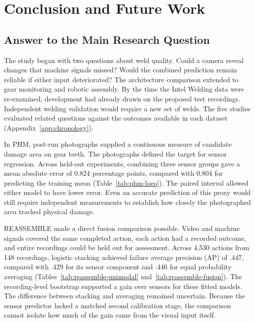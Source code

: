 \chapter{Conclusion and Future Work}
\label{ch:conclusion}

\section{Answer to the Main Research Question}
The study began with two questions about weld quality. Could a camera reveal changes that machine signals missed? Would the combined prediction remain reliable if either input deteriorated? The architecture comparison extended to gear monitoring and robotic assembly. By the time the Intel Welding data were re-examined, development had already drawn on the proposed test recordings. Independent welding validation would require a new set of welds. The five studies evaluated related questions against the outcomes available in each dataset (Appendix~\ref{app:chronology}).

In PHM, post-run photographs supplied a continuous measure of candidate damage area on gear teeth. The photographs defined the target for sensor regression. Across held-out experiments, combining three sensor groups gave a mean absolute error of 0.824 percentage points, compared with 0.804 for predicting the training mean (Table~\ref{tab:phm-loeo}). The paired interval allowed either model to have lower error. Even an accurate prediction of this proxy would still require independent measurements to establish how closely the photographed area tracked physical damage.

REASSEMBLE made a direct fusion comparison possible. Video and machine signals covered the same completed action, each action had a recorded outcome, and entire recordings could be held out for assessment. Across 4,530 actions from 148 recordings, logistic stacking achieved failure average precision (AP) of .447, compared with .429 for its sensor component and .446 for equal probability averaging (Tables~\ref{tab:reassemble-unimodal} and~\ref{tab:reassemble-fusion}). The recording-level bootstrap supported a gain over sensors for these fitted models. The difference between stacking and averaging remained uncertain. Because the sensor predictor lacked a matched second calibration stage, the comparison cannot isolate how much of the gain came from the visual input itself.

